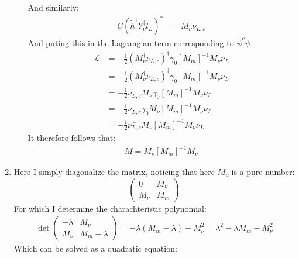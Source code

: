 \documentclass[12pt,a4]{article}
\begin{document}
\begin{enumerate}
\begin{enumerate}
        And similarly:
        \begin{align*}
          C \left(\tilde{h}^\dagger Y^\dagger_\nu l_L\right)^*
               &=  M_\nu^\dagger \nu_{L, c}
        \end{align*}
        And puting this in the Lagrangian term corresponding to $\bar{\psi}^{c} \psi$
        \begin{align*}
          \mathcal{L} &= - \frac{1}{2} \left(M_\nu^\dagger \nu_{L, c}\right)^\dagger \gamma_0 [M_m ]^{-1} M_\nu \nu_L\\
                      &= - \frac{1}{2} \left(M_\nu^\dagger\nu_{L, c}\right)^\dagger \gamma_0 [M_m ]^{-1} M_\nu \nu_L\\
                      &= - \frac{1}{2} \nu_{L, c}^\dagger M_\nu \gamma_0 [M_m ]^{-1} M_\nu \nu_L\\
                      &= - \frac{1}{2} \nu_{L, c}^\dagger \gamma_0  M_\nu [M_m ]^{-1} M_\nu \nu_L\\
                      &= - \frac{1}{2} \bar{\nu_{L, c}} M_\nu [M_m ]^{-1} M_\nu \nu_L
        \end{align*}
        It therefore follows that:
        \begin{align*}
          M= M_\nu [M_m ]^{-1} M_\nu 
        \end{align*}
    \end{enumerate}
  \item
    \begin{enumerate}
        Here I simply diagonalize the matrix, noticing that here $M_\nu$ is a pure number:
        \begin{equation*}
          \left(
          \begin{matrix}
            0 & M_\nu\\
            M_\nu & M_m
          \end{matrix}
          \right)
        \end{equation*}
        For which I determine the charachteristic polynomial:
        \begin{align*}
          \det
          \left(
          \begin{matrix}
            -\lambda  & M_\nu\\
            M_\nu & M_m -\lambda
          \end{matrix}
          \right) = -\lambda(M_m - \lambda) - M_\nu^2 = \lambda^2 - \lambda M_m - M_\nu^2
        \end{align*}
        Which can be solved as a quadratic equation:
        \begin{align*}

\end{align*}
\end{enumerate}
\end{enumerate}
\end{document}
